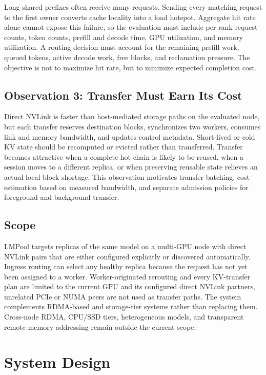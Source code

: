 \documentclass{article}
\newcommand{\sys}{LMPool}
\begin{document}
Long shared prefixes often receive many requests. Sending every matching request to the first owner converts cache locality into a load hotspot. Aggregate hit rate alone cannot expose this failure, so the evaluation must include per-rank request counts, token counts, prefill and decode time, GPU utilization, and memory utilization. A routing decision must account for the remaining prefill work, queued tokens, active decode work, free blocks, and reclamation pressure. The objective is not to maximize hit rate, but to minimize expected completion cost.

\subsection{Observation 3: Transfer Must Earn Its Cost}

Direct NVLink is faster than host-mediated storage paths on the evaluated node, but each transfer reserves destination blocks, synchronizes two workers, consumes link and memory bandwidth, and updates control metadata. Short-lived or cold KV state should be recomputed or evicted rather than transferred. Transfer becomes attractive when a complete hot chain is likely to be reused, when a session moves to a different replica, or when preserving reusable state relieves an actual local block shortage. This observation motivates transfer batching, cost estimation based on measured bandwidth, and separate admission policies for foreground and background transfer.

\subsection{Scope}

\sys{} targets replicas of the same model on a multi-GPU node with direct NVLink pairs that are either configured explicitly or discovered automatically. Ingress routing can select any healthy replica because the request has not yet been assigned to a worker. Worker-originated rerouting and every KV-transfer plan are limited to the current GPU and its configured direct NVLink partners, unrelated PCIe or NUMA peers are not used as transfer paths. The system complements RDMA-based and storage-tier systems rather than replacing them. Cross-node RDMA, CPU/SSD tiers, heterogeneous models, and transparent remote memory addressing remain outside the current scope.

\section{System Design}
\label{sec:design}
\end{document}
